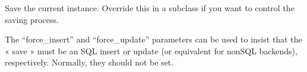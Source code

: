 \documentclass[letterpaper,10pt,french]{sphinxmanual}
\begin{document}
\begin{fulllineitems}

\begin{fulllineitems}
\label{\detokenize{main/model:main.models.Charge.save}}
\pysigstartsignatures
{}
\pysigstopsignatures
\sphinxAtStartPar
Save the current instance. Override this in a subclass if you want to
control the saving process.

\sphinxAtStartPar
The “force\_insert” and “force\_update” parameters can be used to insist
that the « save » must be an SQL insert or update (or equivalent for
non\sphinxhyphen{}SQL backends), respectively. Normally, they should not be set.

\end{fulllineitems}


\end{fulllineitems}

\end{document}
